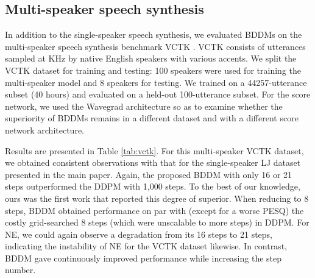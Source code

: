 \subsection{Multi-speaker speech synthesis}
In addition to the single-speaker speech synthesis, we evaluated BDDMs on the multi-speaker speech synthesis benchmark VCTK \citep{yamagishi2019vctk}. VCTK consists of utterances sampled at  KHz by  native English speakers with various accents. 
We split the VCTK dataset for training and testing: 100 speakers were used for training the multi-speaker model and 8 speakers for testing.
We trained on a 44257-utterance subset (40 hours) and evaluated on a held-out 100-utterance subset. For the score network, we used the Wavegrad architecture \citep{nanxin2020} so as to examine whether the superiority of BDDMs remains in a different dataset and with a different score network architecture.


Results are presented in Table \ref{tab:vctk}. For this multi-speaker VCTK dataset, we obtained consistent observations with that for the single-speaker LJ dataset presented in the main paper.
Again, the proposed BDDM with only 16 or 21 steps outperformed the DDPM with 1,000 steps. To the best of our knowledge, ours was the first work that reported this degree of superior. When reducing to 8 steps, BDDM obtained performance on par with (except for a worse PESQ) the costly grid-searched 8 steps (which were unscalable to more steps) in DDPM. 
For NE, we could again observe a degradation from its 16 steps to 21 steps, indicating the instability of NE for the VCTK dataset likewise. In contrast, BDDM gave continuously improved performance while increasing the step number.








